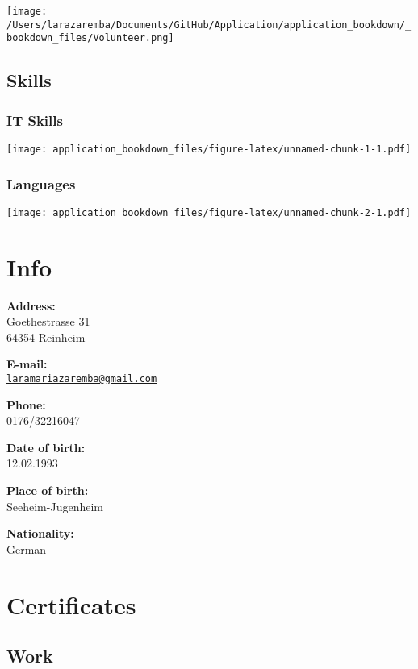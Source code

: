 \documentclass[
]{book}
\begin{document}
\texttt{[image: /Users/larazaremba/Documents/GitHub/Application/application\_bookdown/\_bookdown\_files/Volunteer.png]}

\hypertarget{skills}{%
\section{Skills}\label{skills}}

\hypertarget{it-skills}{%
\subsection{IT Skills}\label{it-skills}}

\texttt{[image: application\_bookdown\_files/figure-latex/unnamed-chunk-1-1.pdf]}

\hypertarget{languages}{%
\subsection{Languages}\label{languages}}

\texttt{[image: application\_bookdown\_files/figure-latex/unnamed-chunk-2-1.pdf]}

\hypertarget{info}{%
\chapter{Info}\label{info}}

\textbf{Address:}\\
Goethestrasse 31\\
64354 Reinheim

\textbf{E-mail:}\\
\href{mailto:laramariazaremba@gmail.com}{\nolinkurl{laramariazaremba@gmail.com}}

\textbf{Phone:}\\
0176/32216047

\textbf{Date of birth:}\\
12.02.1993

\textbf{Place of birth:}\\
Seeheim-Jugenheim

\textbf{Nationality:}\\
German

\hypertarget{certificates}{%
\chapter{Certificates}\label{certificates}}

\hypertarget{work}{%
\section{Work}\label{work}}
\end{document}
